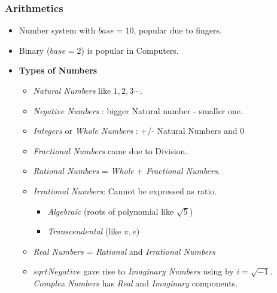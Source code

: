 \begin{frame}[fragile]
\frametitle{Arithmetics}
\begin{itemize}[label=\textbullet,noitemsep,nolistsep]
\item Number system with $base = 10$, popular due to fingers. 
\item Binary ($base=2$) is popular in Computers. %
\item \textbf{Types of Numbers}
	\begin{itemize}[noitemsep,nolistsep,leftmargin=*,label=\textbullet]
	\item \textit{Natural Numbers} like $1,2,3 \cdots$.
	\item \textit{Negative Numbers} : bigger Natural number - smaller one.
	\item \textit{Integers} or \textit{Whole Numbers} : +/- Natural Numbers  and $0$
	\item \textit{Fractional Numbers} came due to Division. 
	\item \textit{Rational Numbers} = \textit{Whole} + \textit{Fractional Numbers}. 
	\item  \textit{Irrational Numbers}: Cannot be expressed as ratio. 
	\begin{itemize}
	\item \textit{Algebraic} (roots of polynomial like $\sqrt{5}$) 
	\item \textit{Transcendental} (like $\pi, e$)
	\end{itemize}
	\item \textit{Real Numbers} = \textit{Rational} and \textit{Irrational Numbers}
	\item $sqrt{Negative}$ gave rise to \textit{Imaginary Numbers} using by $i = \sqrt{-1}$. \textit{Complex Numbers} has \textit{Real} and \textit{Imaginary} components.
	\end{itemize}

\end{itemize}
\end{frame}
